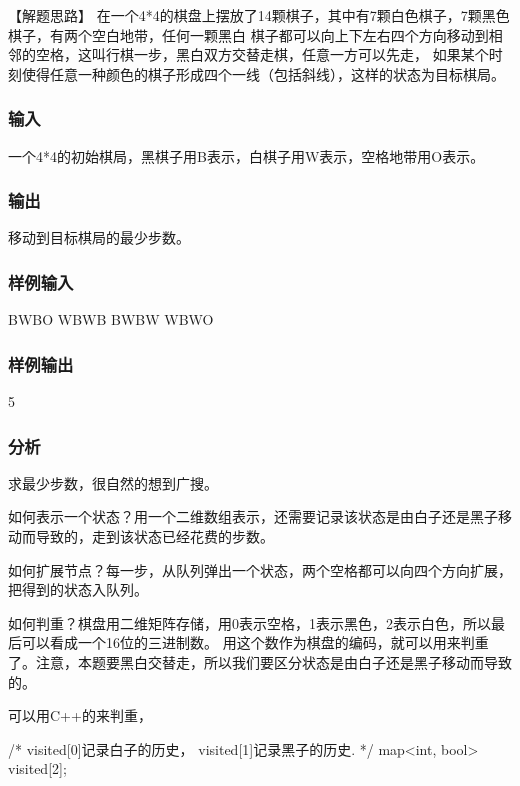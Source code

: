 【解题思路】
在一个4*4的棋盘上摆放了14颗棋子，其中有7颗白色棋子，7颗黑色棋子，有两个空白地带，任何一颗黑白
棋子都可以向上下左右四个方向移动到相邻的空格，这叫行棋一步，黑白双方交替走棋，任意一方可以先走，
如果某个时刻使得任意一种颜色的棋子形成四个一线（包括斜线），这样的状态为目标棋局。

\subsubsection{输入}
一个4*4的初始棋局，黑棋子用B表示，白棋子用W表示，空格地带用O表示。

\subsubsection{输出}
移动到目标棋局的最少步数。

\subsubsection{样例输入}
\begin{Code}
BWBO
WBWB
BWBW
WBWO
\end{Code}

\subsubsection{样例输出}
\begin{Code}
5
\end{Code}

\subsubsection{分析}
求最少步数，很自然的想到广搜。

如何表示一个状态？用一个二维数组表示，还需要记录该状态是由白子还是黑子移动而导致的，走到该状态已经花费的步数。

如何扩展节点？每一步，从队列弹出一个状态，两个空格都可以向四个方向扩展，把得到的状态入队列。

如何判重？棋盘用二维矩阵存储，用0表示空格，1表示黑色，2表示白色，所以最后可以看成一个16位的三进制数。
用这个数作为棋盘的编码，就可以用来判重了。注意，本题要黑白交替走，所以我们要区分状态是由白子还是黑子移动而导致的。

可以用C++的来判重，
\begin{Code}
/* visited[0]记录白子的历史， visited[1]记录黑子的历史. */
map<int, bool> visited[2];
\end{Code}

